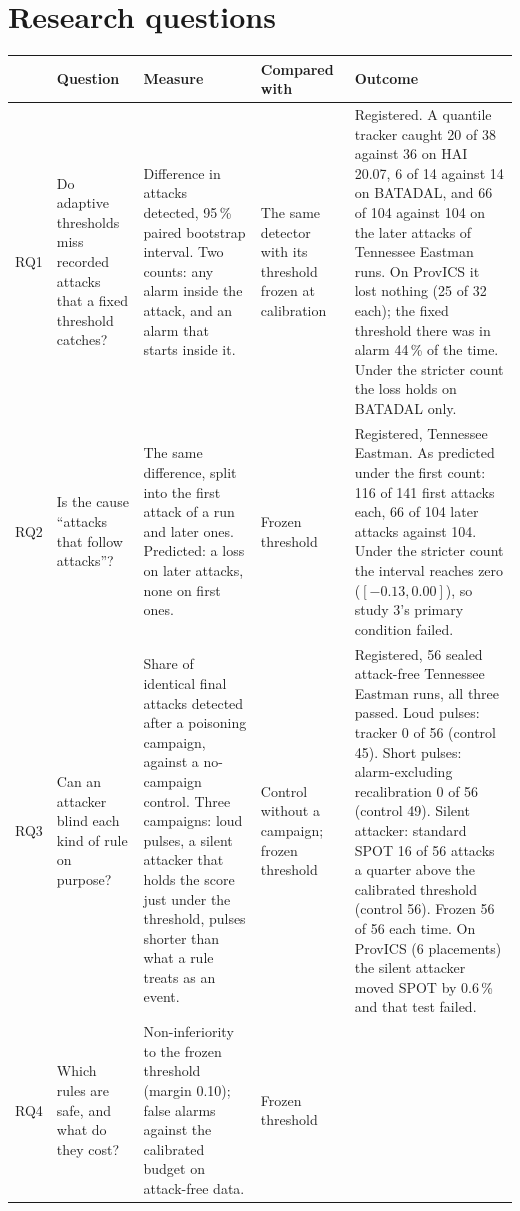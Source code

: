 \documentclass[9pt,a4paper]{extarticle}
\begin{document}
\section{Research questions}
{\footnotesize
\begin{tabularx}{\textwidth}{@{}P{0.6cm}P{2.6cm}P{3.9cm}P{2.1cm}L@{}}
\toprule
 & Question & Measure & Compared with & Outcome \\
\midrule
RQ1 & Do adaptive thresholds miss recorded attacks that a fixed threshold catches? &
Difference in attacks detected, 95\,\% paired bootstrap interval. Two counts: any alarm inside the attack,
and an alarm that starts inside it. & The same detector with its threshold frozen at calibration &
Registered. A quantile tracker caught 20 of 38 against 36 on HAI 20.07, 6 of 14 against 14 on BATADAL, and
66 of 104 against 104 on the later attacks of Tennessee Eastman runs. On ProvICS it lost nothing (25 of 32
each); the fixed threshold there was in alarm 44\,\% of the time. Under the stricter count the loss holds
on BATADAL only. \\
\addlinespace
RQ2 & Is the cause ``attacks that follow attacks''? & The same difference, split into the first attack of
a run and later ones. Predicted: a loss on later attacks, none on first ones. & Frozen threshold &
Registered, Tennessee Eastman. As predicted under the first count: 116 of 141 first attacks each, 66 of
104 later attacks against 104. Under the stricter count the interval reaches zero ($[-0.13, 0.00]$), so
study 3's primary condition failed. \\
\addlinespace
RQ3 & Can an attacker blind each kind of rule on purpose? & Share of identical final attacks detected
after a poisoning campaign, against a no-campaign control. Three campaigns: loud pulses, a silent attacker
that holds the score just under the threshold, pulses shorter than what a rule treats as an event. &
Control without a campaign; frozen threshold &
Registered, 56 sealed attack-free Tennessee Eastman runs, all three passed. Loud pulses: tracker 0 of 56
(control 45). Short pulses: alarm-excluding recalibration 0 of 56 (control 49). Silent attacker: standard
SPOT 16 of 56 attacks a quarter above the calibrated threshold (control 56). Frozen 56 of 56 each time.
On ProvICS (6 placements) the silent attacker moved SPOT by 0.6\,\% and that test failed. \\
\addlinespace
RQ4 & Which rules are safe, and what do they cost? & Non-inferiority to the frozen threshold (margin
0.10); false alarms against the calibrated budget on attack-free data. & Frozen threshold &

\end{tabularx}}
\end{document}
